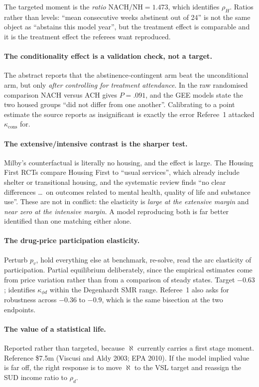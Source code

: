 \documentclass[11pt]{article}
\begin{document}
The targeted moment is the \emph{ratio} $\text{NACH}/\text{NH}=1.473$, which
identifies $\rho_H$. Ratios rather than levels: ``mean consecutive weeks
abstinent out of 24'' is not the same object as ``abstains this model year'', but
the treatment effect is comparable and it is the treatment effect the referees
want reproduced.

\paragraph{The conditionality effect is a validation check, not a target.} The
abstract reports that the abstinence-contingent arm beat the unconditional arm,
but only \emph{after controlling for treatment attendance}. In the raw randomised
comparison NACH versus ACH gives $P=.091$, and the GEE models state the two
housed groups ``did not differ from one another''. Calibrating to a point
estimate the source reports as insignificant is exactly the error Referee~1
attacked $\kappa_{\text{cons}}$ for.

\paragraph{The extensive/intensive contrast is the sharper test.} Milby's
counterfactual is literally no housing, and the effect is large. The Housing
First RCTs compare Housing First to ``usual services'', which already include
shelter or transitional housing, and the systematic review finds ``no clear
differences \dots\ on outcomes related to mental health, quality of life and
substance use''. These are not in conflict: the elasticity is \emph{large at the
extensive margin} and \emph{near zero at the intensive margin}. A model
reproducing both is far better identified than one matching either alone.

\paragraph{The drug-price participation elasticity.} Perturb $p_v$, hold
everything else at benchmark, re-solve, read the arc elasticity of participation.
Partial equilibrium deliberately, since the empirical estimates come from price
variation rather than from a comparison of steady states. Target $-0.63$;
identifies $\kappa_{\phi d}$ within the Degenhardt SMR range. Referee~1 also asks
for robustness across $-0.36$ to $-0.9$, which is the same bisection at the two
endpoints.

\paragraph{The value of a statistical life.} Reported rather than targeted,
because $\aleph$ currently carries a first stage moment. Reference \$7.5m
(Viscusi and Aldy 2003; EPA 2010). If the model implied value is far off, the
right response is to move $\aleph$ to the VSL target and reassign the SUD income
ratio to $\rho_d$.
\end{document}
